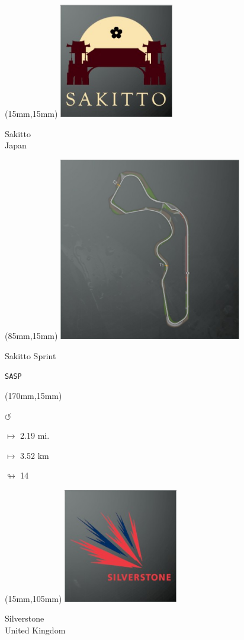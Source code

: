 \begin{textblock*}{60mm}(15mm,15mm)%
\includegraphics[width=50mm]{LG/2015-05-20_00093.png}
\par Sakitto\\ Japan
\end{textblock*}
\begin{textblock*}{80mm}(85mm,15mm)%
\includegraphics[width=80mm]{TR/2015-05-20_00053.png}
\centerline{Sakitto Sprint}
\par\hfill\tiny\tt SASP\\
\end{textblock*}
\begin{textblock*}{30mm}(170mm,15mm)%
\par \Huge$\circlearrowleft$
\Large
\par$\mapsto$ 2.19 mi.
\par$\mapsto$ 3.52 km
\par$\looparrowright$ 14
\end{textblock*}
\begin{textblock*}{60mm}(15mm,105mm)%
\includegraphics[width=50mm]{LG/2015-05-20_00094.png}
\par Silverstone\\ United Kingdom
\end{textblock*}
